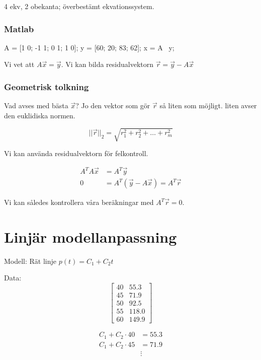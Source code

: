\documentclass[a4paper,10pt,swedish]{memoir}
\numberwithin{equation}{subsection}
\begin{document}
4 ekv, 2 obekanta; överbestämt ekvationssystem.

\subsubsection{Matlab}

\begin{matlabcode}
A = [1 0; -1 1; 0 1; 1 0];
y = [60; 20; 83; 62];
x = A \ y;
\end{matlabcode}

Vi vet att $A\vec{x}=\vec{y}$. Vi kan bilda residualvektorn $\vec{r}=\vec{y}-A\vec{x}$

\subsubsection{Geometrisk tolkning}

Vad avses med bästa $\vec{x}$? Jo den vektor som gör $\vec{r}$ så liten som möjligt. liten avser den euklidiska normen.

\begin{equation}
||\vec{r}||_2 = \sqrt{r_1^2 + r_2^2 + \ldots + r_m^2}
\end{equation}

Vi kan använda residualvektorn för felkontroll.

\begin{align}
A^TA \vec{x} &= A^T\vec{y} \\
0 &= A^T(\vec{y}-A\vec{x}) = A^T \vec{r}
\end{align}

Vi kan således kontrollera våra beräkningar med $A^T\vec{r} = 0$.

\section{Linjär modellanpassning}

Modell: Rät linje $p(t) = C_1 + C_2 t$

Data: \[\left[\begin{array}{cc}40&55.3\\45&71.9\\50&92.5\\55&118.0\\60&149.9\end{array}\right]\]

\begin{align}
C_1 + C_2 \cdot 40 &= 55.3 \\
C_1 + C_2 \cdot 45 &= 71.9 \\
&\vdots
\end{align}
\end{document}
